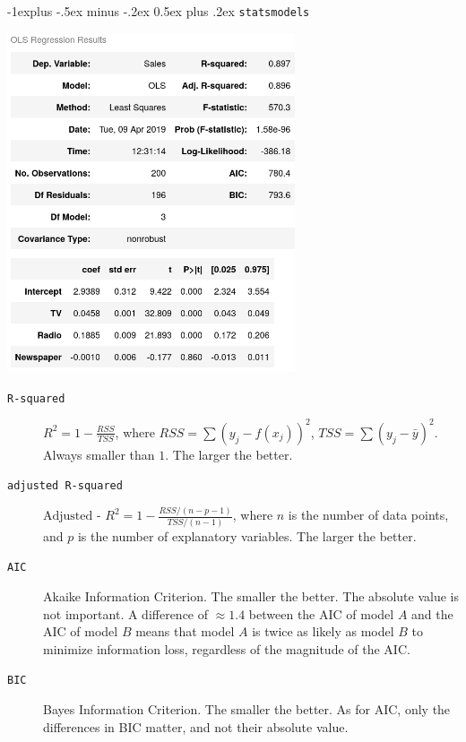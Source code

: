 \documentclass[10pt,landscape]{article}
\makeatletter
\renewcommand{\subsection}{\@startsection{subsection}{2}{0mm}%
                                {-1explus -.5ex minus -.2ex}%
                                {0.5ex plus .2ex}%
                                {\normalfont\normalsize\bfseries}}
\makeatother
\begin{document}
\begin{multicols*}{3}
\subsection{\texttt{statsmodels}}
{\tiny

}
\begin{minipage}{\linewidth}
  \centering
  \includegraphics[width=8.5cm]{figures/statsmodels.png}
\end{minipage}
\begin{description}
  \item[\texttt{R-squared}] $R^2=1 - \frac{RSS}{TSS}$, where $RSS = \sum (y_j - f(x_j))^2$, $TSS = \sum (y_j - \bar{y})^2$. Always smaller than $1$. The larger the better.
  \item[\texttt{adjusted R-squared}] $\text{Adjusted - }R^2=1 - \frac{RSS/(n-p-1)}{TSS/(n-1)}$, where $n$ is the number of data points, and $p$ is the number of explanatory variables. The larger the better.
  \item[\texttt{AIC}] Akaike Information Criterion. The smaller the better. The absolute value is not important. A difference of $\approx 1.4$ between the AIC of model $A$ and the AIC of model $B$ means that model $A$ is twice as likely as model $B$ to minimize information loss, regardless of the magnitude of the AIC.
  \item[\texttt{BIC}] Bayes Information Criterion. The smaller the better. As for AIC, only the differences in BIC matter, and not their absolute value.

\end{description}
\end{multicols*}
\end{document}

